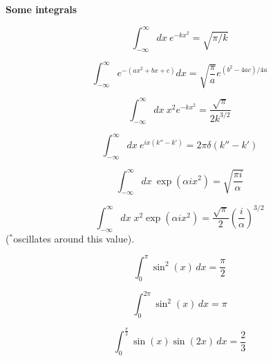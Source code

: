 {\bf Some integrals}

\begin{equation}
\int_{-\infty}^{\infty} dx \: e^{-kx^2} = \sqrt{\pi/k}
\end{equation}

\begin{equation} %
\int_{-\infty}^{\infty} e^{-\left(a x^2+b x+c\right)} d x=\sqrt{\frac{\pi}{a}} e^{\left(b^2-4 a c\right) / 4 a}
\end{equation}

\begin{equation}
\int_{-\infty}^{\infty} dx \: x^2 e^{-kx^2} = \frac{\sqrt{\pi}}{2 k^{3/2}}
\end{equation}

\begin{equation}
\int_{-\infty}^{\infty} dx \: e^{ix(k''-k')} = 2 \pi \delta (k''-k')
\end{equation}

\begin{equation}
\int_{-\infty}^{\infty} dx \: \exp (\alpha i x^2) = \sqrt{\frac{\pi i}{\alpha}}
\label{eq:simp_int}
\end{equation}

\begin{equation}
\int_{-\infty}^{\infty} dx \; x^2 \exp (\alpha i x^2)
  = \frac{\sqrt{\pi}}{2} \left( \frac{i}{\alpha} \right)^{3/2}
\label{eq:2nd_simp_int}
\end{equation}
{\small ($^{*}$oscillates around this value)}.

\begin{equation}
\int_{0}^{\pi} \sin^{2}{\left (x \right )}\, dx  =  \frac{\pi}{2}
\end{equation}

\begin{equation}
\int_{0}^{2 \pi} \sin^{2}{\left (x \right )}\, dx  =  \pi
\end{equation}

\begin{equation}
\int_{0}^{\frac{\pi}{2}} \sin{\left (x \right )} \sin{\left (2 x \right )}\, dx  =  \frac{2}{3}
\end{equation}
